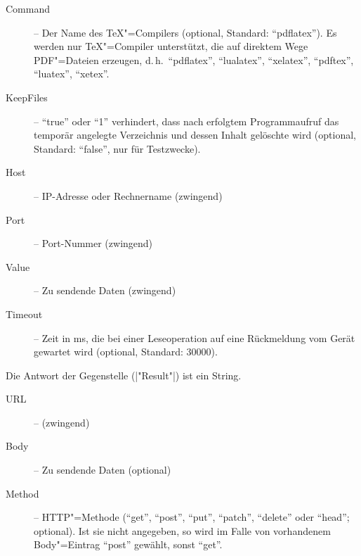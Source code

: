 \documentclass[titlepage=false,toc=nobibliography]{vl-report}
\newcommand*\action[1]{\fbox{\nolinkurl{#1}}\medskip\par}
\begin{document}
\begin{description}
\begin{description}
\begin{description}
        \item[Command] -- Der Name des \TeX"=Compilers (optional, Standard:
        "`pdflatex"'). Es werden nur \TeX"=Compiler unterstützt, die auf
        direktem Wege PDF"=Dateien erzeugen, d.\,h.\ "`pdflatex"',
        "`lualatex"', "`xelatex"', "`pdftex"', "`luatex"', "`xetex"'.

        \item[KeepFiles] -- "`true"' oder "`1"' verhindert, dass nach
        erfolgtem Programmaufruf das temporär angelegte Verzeichnis und
        dessen Inhalt gelöschte wird (optional, Standard: "`false"', nur für
        Testzwecke).

      \end{description}

    \item \action{TCP}

      \begin{description}

        \item[Host] -- IP-Adresse oder Rechnername (zwingend)

        \item[Port] -- Port-Nummer (zwingend)

        \item[Value] -- Zu sendende Daten (zwingend)

        \item[Timeout] -- Zeit in ms, die bei einer Leseoperation auf eine
        Rückmeldung vom Gerät gewartet wird (optional, Standard: 30000).

      \end{description}

      \noindent Die Antwort der Gegenstelle (|"Result"|) ist ein String.


    \item \action{HTTP}

      \begin{description}

        \item[URL] -- (zwingend)

        \item[Body] -- Zu sendende Daten (optional)

        \item[Method] -- HTTP"=Methode ("`get"', "`post"', "`put"', "`patch"', "`delete"' oder "`head"';
        optional). Ist sie nicht angegeben, so wird im Falle von vorhandenem
        Body"=Eintrag "`post"' gewählt, sonst "`get"'.


\end{description}
\end{description}
\end{description}
\end{document}

